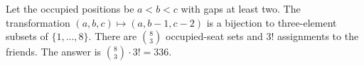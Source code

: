 Let the occupied positions be $a<b<c$ with gaps at least two. The transformation $(a,b,c)\mapsto(a,b-1,c-2)$ is a bijection to three-element subsets of $\{1,\ldots,8\}$. There are $\binom83$ occupied-seat sets and $3!$ assignments to the friends. The answer is $\binom83\cdot3!=\boxed{336}$.

